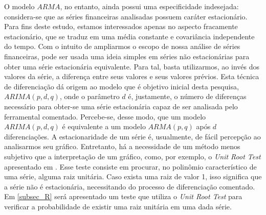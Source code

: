 \documentclass[12pt]{article}
\begin{document}
O modelo $ ARMA $, no entanto, ainda possui uma especificidade indesejada: considera-se
que as séries financeiras analisadas possuem caráter estacionário. Para fins deste estudo,
estamos interessados apenas no aspecto fracamente estacionário, que se traduz em uma
média constante e covariância independente do tempo.
Com o intuito de ampliarmos o escopo de nossa análise de séries financeiras, pode ser
usada uma ideia simples em séries não estacionárias para obter uma série estacionária
equivalente. Para tal, basta utilizarmos, ao invés dos valores da série, a diferença entre seus
valores e seus valores prévios. Esta técnica de diferenciação dá origem ao modelo que é
objetivo inicial desta pesquisa, $ARIMA(p,d,q)$, onde o parâmetro $d$ é, justamente, o número de
diferenças necessário para obter-se uma série estacionária capaz de ser analisada pelo
ferramental comentado. Percebe-se, desse modo, que um modelo $ARIMA(p,d,q)$ é
equivalente a um modelo $ARMA(p,q)$ após $d$ diferenciações. A estacionaridade de um série é, usualmente, de fácil percepção ao analisarmos seu gráfico. Entretanto, há a necessidade de um método menos subjetivo que a interpretação de um gráfico, como, por exemplo, o \emph{Unit Root Test} apresentado em \cite{Tsay}. Esse teste consiste em procurar, no polinômio característico de uma série, alguma raiz unitária. Caso exista uma raiz de valor 1, isso significa que a série não é estacionária, necessitando do processo de diferenciação comentado. Em \ref{subsec_R} será apresentado um teste que utiliza o \emph{Unit Root Test} para verificar a probabilidade de existir uma raiz unitária em uma dada série.
\end{document}
